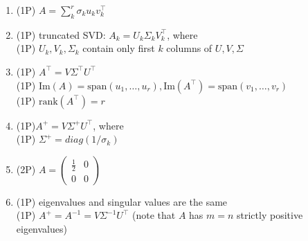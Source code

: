 {\color{solution}
\begin{enumerate}
	\item \textcolor{exampoints}{(1P)} $A =\sum_k^r \sigma_k u_kv_k^\top$
	\item \textcolor{exampoints}{(1P)} truncated SVD: $A_k = U_k \Sigma_k V_k^\top$, where\\
	\textcolor{exampoints}{(1P)} $U_k, V_k,\Sigma_k$ contain only first $k$ columns of $U, V,\Sigma$
	\item \textcolor{exampoints}{(1P)} $A^\top = V\Sigma^\top U ^\top$\\
	\textcolor{exampoints}{(1P)} $\text{Im}(A)= \text{span}(u_1,\ldots, u_r), \text{Im}(A^\top)= \text{span}(v_1,\ldots, v_r)$\\
	\textcolor{exampoints}{(1P)} $\text{rank}(A^\top) = r$
	\item \textcolor{exampoints}{(1P)}$A^+ = V\Sigma^+ U^\top$, where\\
	\textcolor{exampoints}{(1P)} $\Sigma^+ = diag(1/\sigma_k)$
	\item \textcolor{exampoints}{(2P)} $A = \begin{pmatrix}
	\frac{1}{2} & 0\\0&0
	\end{pmatrix}$
	\item \textcolor{exampoints}{(1P)} eigenvalues and singular values are the same\\
	\textcolor{exampoints}{(1P)}  $A^+ = A^{-1} = V \Sigma^{-1}U^\top$ (note that $A$ has $m=n$ strictly positive eigenvalues)
\end{enumerate}
}
